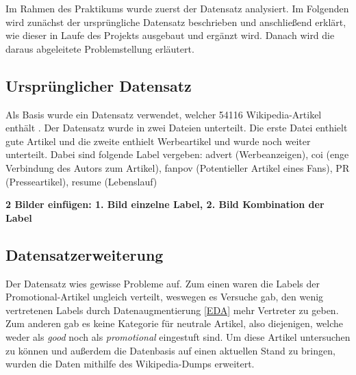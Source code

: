 
Im Rahmen des Praktikums wurde zuerst der Datensatz analysiert. Im Folgenden wird zunächst der ursprüngliche Datensatz beschrieben und anschließend erklärt, wie dieser in Laufe des Projekts ausgebaut und ergänzt wird. Danach wird die daraus abgeleitete Problemstellung erläutert.

\subsection{Ursprünglicher Datensatz}
\label{UrsprunglicherDatensatz}
Als Basis wurde ein Datensatz verwendet, welcher 54116 Wikipedia-Artikel enthält \cite{Urbanbricks2020}. Der Datensatz wurde in zwei Dateien unterteilt. Die erste Datei enthielt gute Artikel und die zweite enthielt %
Werbeartikel und wurde noch weiter unterteilt. Dabei sind folgende Label vergeben: advert (Werbeanzeigen), coi (enge Verbindung des Autors zum Artikel), fanpov (Potentieller Artikel eines Fans), PR  (Presseartikel), resume (Lebenslauf)

\textbf{2 Bilder einfügen: 1. Bild einzelne Label, 2. Bild Kombination der Label}
\\



\subsection{Datensatzerweiterung}
\label{ProblemeDatensatz}
\label{WPDump}
Der Datensatz wies gewisse Probleme auf. Zum einen waren die Labels der Promotional-Artikel ungleich verteilt, weswegen es Versuche gab, den wenig vertretenen Labels durch Datenaugmentierung \ref{EDA} mehr Vertreter zu geben. Zum anderen gab es keine Kategorie für neutrale Artikel, also diejenigen, welche weder als \emph{good} noch als \emph{promotional} eingestuft sind. Um diese Artikel untersuchen zu können und außerdem die Datenbasis auf einen aktuellen Stand zu bringen, wurden die Daten mithilfe des Wikipedia-Dumps erweitert.

